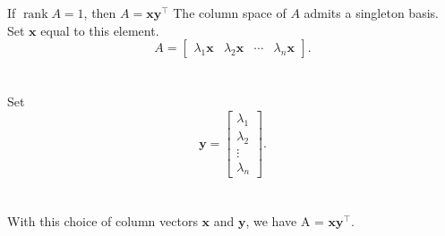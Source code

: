 \documentclass{beamer}
\def\x{\bm{x}}
\def\y{\bm{y}}
\def\rank{\operatorname{rank}}
\begin{document}
        \begin{frame}{If $\rank{A} = 1$, then $A = \x\y^\top$}
                The column space of $A$ admits a singleton basis. Set $\x$ equal to this element. \\
                \[
                        A = \begin{bmatrix}
                                \lambda_1\x & \lambda_2\x & \cdots & \lambda_n\x
                        \end{bmatrix}.
                \] \\~\\
                \pause
                Set
                \[
                        \y = \begin{bmatrix}
                                \lambda_1 \\ \lambda_2 \\ \vdots \\ \lambda_n
                        \end{bmatrix}.
                \]\\~\\
                With this choice of column vectors $\x$ and $\y$, we have A = $\x\y^\top$.
        \end{frame}
\end{document}
